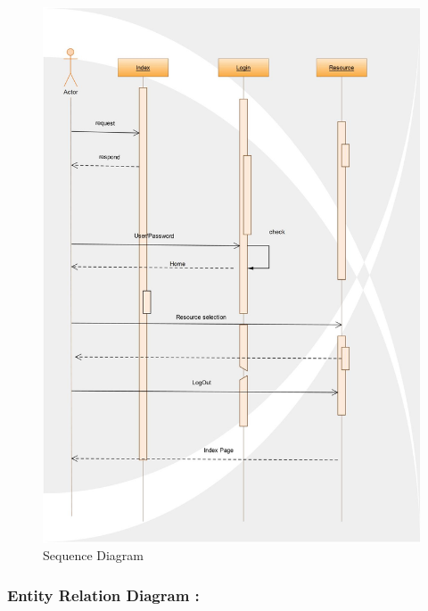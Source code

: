 \documentclass[12pt,a4paper,final,oneside]{report}
\begin{document}
	\begin{figure}
		\centering \vfill	\includegraphics[totalheight=0.5\textheight,angle=0]
		{seq1.jpg}
		\caption{Sequence Diagram}
	\end{figure}
	\subsubsection{Entity Relation Diagram :}
\end{document}
